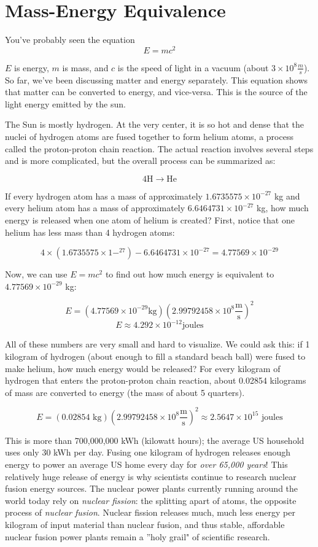 \section{Mass-Energy Equivalence}
You've probably seen the equation
$$E = mc^2$$

$E$ is energy, $m$ is mass, and $c$ is the speed of light in a vacuum (about $3 
\times 10^8 \frac{m}{s}$). So far, we've been discussing matter and energy 
separately. This equation shows that matter can be converted to energy, and 
vice-versa. This is the source of the light energy emitted by the sun. 

The Sun is mostly hydrogen. At the very center, it is so hot and dense that the 
nuclei of hydrogen atoms are fused together to form helium atoms, a process 
called the proton-proton chain reaction. The actual reaction involves several 
steps and is more complicated, but the overall process can be summarized as:

$$4\text{H} \to \text{He}$$

If every hydrogen atom has a mass of approximately $1.6735575 \times 10^{-27}$ kg 
and every helium atom has a mass of approximately $6.6464731 \times 10^{-27}$ kg, 
how much energy is released when one atom of helium is created? First, notice 
that one helium has less mass than 4 hydrogen atoms:

$$4 \times \left( 1.6735575 \times 1-^{27} \right) - 6.6464731 \times 10^{-27} = 
4.77569 \times 10^{-29}$$

Now, we can use $E = mc^2$ to find out how much energy is equivalent to $4.77569 
\times 10^{-29}$ kg:

$$E = \left( 4.77569 \times 10^{-29} \text{kg} \right) \left( 2.99792458 \times 
10^8 \frac{\text{m}}{\text{s}} \right)^2$$
$$E \approx 4.292 \times 10^{-12} \text{joules}$$

All of these numbers are very small and hard to visualize. We could ask this: if 
1 kilogram of hydrogen (about enough to fill a standard beach ball) were fused to 
make helium, how much energy would be released? For every kilogram of hydrogen 
that enters the proton-proton chain reaction, about 0.02854 kilograms of mass are 
converted to energy (the mass of about 5 quarters).

$$E = \left( 0.02854 \text{ kg} \right) \left( 2.99792458 \times 10^8 \frac{
\text{m}}{\text{s}} \right)^2 \approx 2.5647 \times 10^{15} \text{ joules}$$

This is more than 700,000,000 kWh (kilowatt hours); the average US household 
uses only 30 kWh per day. Fusing one kilogram of hydrogen releases enough energy 
to power an average US home every day for \textit{over 65,000 years}! This 
relatively huge release of energy is why scientists continue to research nuclear 
fusion energy sources. The nuclear power plants currently running around the world 
today rely on \textit{nuclear fission}: the splitting apart of atoms, the opposite 
process of \textit{nuclear fusion}. Nuclear fission releases much, much less energy 
per kilogram of input material than nuclear fusion, and thus stable, affordable 
nuclear fusion power plants remain a ''holy grail" of scientific research. 


